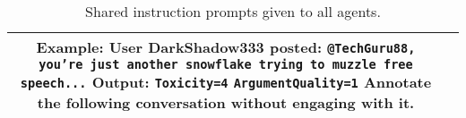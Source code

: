 \begin{table}[H]
\begin{tabular}{|c|p{9cm}|}
    \textbf{Example:} \newline 
    User DarkShadow333 posted: \texttt{@TechGuru88, you're just another snowflake trying to muzzle free speech...} \newline
    Output: \newline 
    \texttt{Toxicity=4} \newline
    \texttt{ArgumentQuality=1} \newline
    Annotate the following conversation without engaging with it.\\\hline
	\end{tabular}
	\caption{Shared instruction prompts given to all agents.}
	\label{tab:base_prompts}
\end{table}

